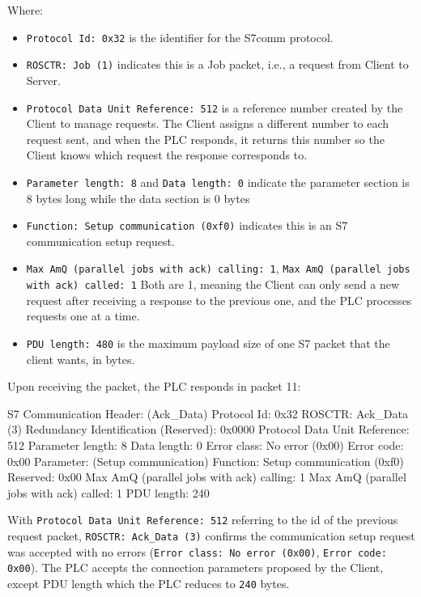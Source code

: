 \documentclass[../main.tex]{subfiles}
\begin{document}
Where:

\begin{itemize}
    \item \texttt{Protocol Id: 0x32} is the identifier for the S7comm protocol.
    \item \texttt{ROSCTR: Job (1)} indicates this is a Job packet, i.e., a request from Client to Server.

    \item \texttt{Protocol Data Unit Reference: 512} is a reference number created by the Client to manage requests. The Client assigns a different number to each request sent, and when the PLC responds, it returns this number so the Client knows which request the response corresponds to.

    \item \texttt{Parameter length: 8} and \texttt{Data length: 0} indicate the parameter section is 8 bytes long while the data section is 0 bytes

    \item \texttt{Function: Setup communication (0xf0)} indicates this is an S7 communication setup request.

    \item \texttt{Max AmQ (parallel jobs with ack) calling: 1}, \texttt{Max AmQ (parallel jobs with ack) called: 1} Both are 1, meaning the Client can only send a new request after receiving a response to the previous one, and the PLC processes requests one at a time.

    \item \texttt{PDU length: 480} is the maximum payload size of one S7 packet that the client wants, in bytes.
\end{itemize}

Upon receiving the packet, the PLC responds in packet 11:

\begin{packetdump}
S7 Communication
    Header: (Ack_Data)
        Protocol Id: 0x32
        ROSCTR: Ack_Data (3)
        Redundancy Identification (Reserved): 0x0000
        Protocol Data Unit Reference: 512
        Parameter length: 8
        Data length: 0
        Error class: No error (0x00)
        Error code: 0x00
    Parameter: (Setup communication)
        Function: Setup communication (0xf0)
        Reserved: 0x00
        Max AmQ (parallel jobs with ack) calling: 1
        Max AmQ (parallel jobs with ack) called: 1
        PDU length: 240
\end{packetdump}

With \texttt{Protocol Data Unit Reference: 512} referring to the id of the previous request packet, \texttt{ROSCTR: Ack\_Data (3)} confirms the communication setup request was accepted with no errors (\texttt{Error class: No error (0x00)}, \texttt{Error code: 0x00}). The PLC accepts the connection parameters proposed by the Client, except PDU length which the PLC reduces to \texttt{240} bytes.
\end{document}
